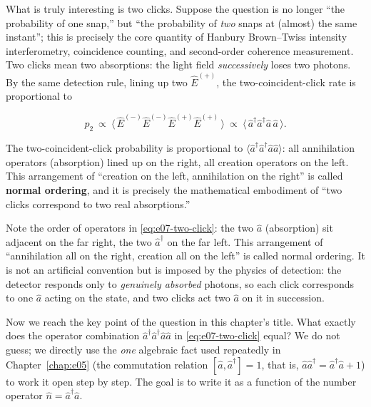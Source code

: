 What is truly interesting is two clicks. Suppose the question is no longer ``the probability of one snap,'' but ``the probability of \emph{two} snaps at (almost) the same instant''; this is precisely the core quantity of Hanbury Brown--Twiss intensity interferometry, coincidence counting, and second-order coherence measurement. Two clicks mean two absorptions: the light field \emph{successively} loses two photons. By the same detection rule, lining up two \(\hat E^{(+)}\), the two-coincident-click rate is proportional to

\begin{equation}
  p_2\ \propto\ \big\langle\,\hat E^{(-)}\hat E^{(-)}\hat E^{(+)}\hat E^{(+)}\,\big\rangle
  \ \propto\ \big\langle\,\hat a^\dagger\hat a^\dagger\hat a\,\hat a\,\big\rangle .
  \label{eq:e07-two-click}
\end{equation}
\begin{formulaexplain}
The two-coincident-click probability is proportional to \(\langle\hat a^\dagger\hat a^\dagger\hat a\hat a\rangle\): all annihilation operators (absorption) lined up on the right, all creation operators on the left. This arrangement of ``creation on the left, annihilation on the right'' is called \textbf{normal ordering}, and it is precisely the mathematical embodiment of ``two clicks correspond to two real absorptions.''
\end{formulaexplain}

Note the order of operators in \eqref{eq:e07-two-click}: the two \(\hat a\) (absorption) sit adjacent on the far right, the two \(\hat a^\dagger\) on the far left. This arrangement of ``annihilation all on the right, creation all on the left'' is called normal ordering. It is not an artificial convention but is imposed by the physics of detection: the detector responds only to \emph{genuinely absorbed} photons, so each click corresponds to one \(\hat a\) acting on the state, and two clicks act two \(\hat a\) on it in succession.

Now we reach the key point of the question in this chapter's title. What exactly does the operator combination \(\hat a^\dagger\hat a^\dagger\hat a\hat a\) in \eqref{eq:e07-two-click} equal? We do not guess; we directly use the \emph{one} algebraic fact used repeatedly in Chapter~\ref{chap:e05} (the commutation relation \([\hat a,\hat a^\dagger]=1\), that is, \(\hat a\hat a^\dagger=\hat a^\dagger\hat a+1\)) to work it open step by step. The goal is to write it as a function of the number operator \(\hat n=\hat a^\dagger\hat a\).

